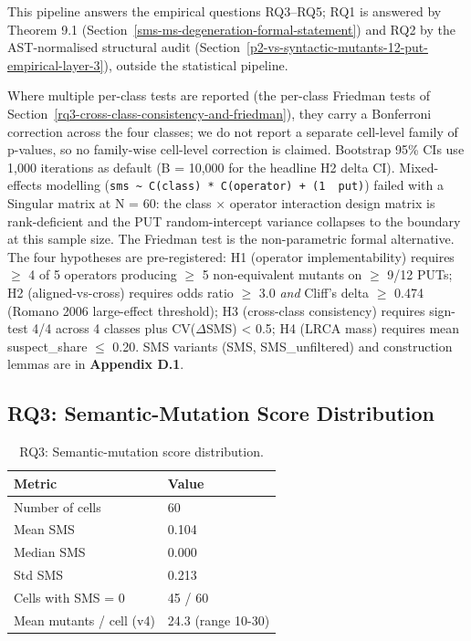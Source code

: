 \documentclass[12pt]{article}
\begin{document}
This pipeline answers the empirical questions RQ3--RQ5; RQ1 is answered
by Theorem 9.1 (Section~\ref{sms-ms-degeneration-formal-statement}) and RQ2 by the AST-normalised structural audit
(Section~\ref{p2-vs-syntactic-mutants-12-put-empirical-layer-3}), outside the statistical pipeline.

Where multiple per-class tests are reported (the per-class Friedman tests
of Section~\ref{rq3-cross-class-consistency-and-friedman}), they carry a Bonferroni correction across the four classes; we
do not report a separate cell-level family of p-values, so no family-wise
cell-level correction is claimed. Bootstrap 95\% CIs use 1,000 iterations
as default (B = 10,000 for the headline H2 delta CI). Mixed-effects
modelling
(\texttt{sms\ \textasciitilde{}\ C(class)\ *\ C(operator)\ +\ (1\ \textbar{}\ put)})
failed with a Singular matrix at N = 60: the class $\times$ operator
interaction design matrix is rank-deficient and the PUT random-intercept
variance collapses to the boundary at this sample size. The Friedman test
is the non-parametric formal alternative. The four hypotheses are
pre-registered: H1 (operator implementability) requires $\geq$ 4 of 5
operators producing $\geq$ 5 non-equivalent mutants on $\geq$ 9/12 PUTs; H2
(aligned-vs-cross) requires odds ratio $\geq$ 3.0 \emph{and} Cliff's delta $\geq$
0.474 (Romano 2006 large-effect threshold); H3 (cross-class consistency)
requires sign-test 4/4 across 4 classes plus CV($\Delta$SMS) \textless{} 0.5;
H4 (LRCA mass) requires mean suspect\_share $\leq$ 0.20. SMS variants
(SMS, SMS\_unfiltered) and construction lemmas are in
\textbf{Appendix D.1}.

\subsection{RQ3: Semantic-Mutation Score Distribution}\label{rq1-60-cell-distribution}

{\def\LTcaptype{table} %
\begin{longtable}[]{@{}ll@{}}
\caption{RQ3: Semantic-mutation score distribution.}\\
\toprule\noalign{}
Metric & Value \\
\midrule\noalign{}
\endhead
\bottomrule\noalign{}
\endlastfoot
Number of cells & 60 \\
Mean SMS & 0.104 \\
Median SMS & 0.000 \\
Std SMS & 0.213 \\
Cells with SMS = 0 & 45 / 60 \\
Mean mutants / cell (v4) & 24.3 (range 10-30) \\
\end{longtable}
}
\end{document}
